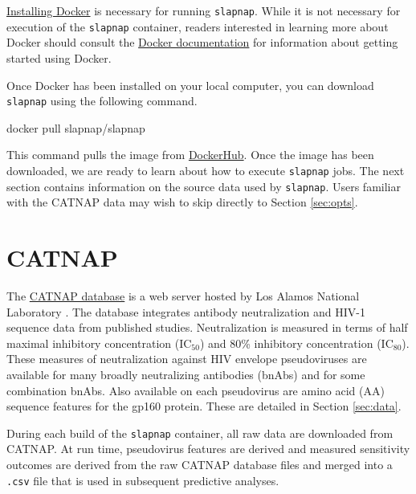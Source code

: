 \documentclass[]{article}
\newenvironment{Shaded}{\begin{snugshade}}{\end{snugshade}}
\newcommand{\ExtensionTok}[1]{#1}
\newcommand{\NormalTok}[1]{#1}
\begin{document}
\href{https://docs.docker.com/docker-for-windows/install/}{Installing
Docker} is necessary for running \texttt{slapnap}. While it is not
necessary for execution of the \texttt{slapnap} container, readers
interested in learning more about Docker should consult the
\href{https://docs.docker.com/get-started/}{Docker documentation} for
information about getting started using Docker.

Once Docker has been installed on your local computer, you can download
\texttt{slapnap} using the following command.

\begin{Shaded}
\begin{Highlighting}[]
\ExtensionTok{docker}\NormalTok{ pull slapnap/slapnap}
\end{Highlighting}
\end{Shaded}

This command pulls the image from
\href{https://hub.docker.com/}{DockerHub}. Once the image has been
downloaded, we are ready to learn about how to execute \texttt{slapnap}
jobs. The next section contains information on the source data used by
\texttt{slapnap}. Users familiar with the CATNAP data may wish to skip
directly to Section \ref{sec:opts}.

\section{CATNAP}\label{sec:catnap}

The
\href{https://www.hiv.lanl.gov/components/sequence/HIV/neutralization/index.html}{CATNAP
database} is a web server hosted by Los Alamos National Laboratory
\citep{yoon2015catnap}. The database integrates antibody neutralization
and HIV-1 sequence data from published studies. Neutralization is
measured in terms of half maximal inhibitory concentration (IC\(_{50}\))
and 80\% inhibitory concentration (IC\(_{80}\)). These measures of
neutralization against HIV envelope pseudoviruses are available for many
broadly neutralizing antibodies (bnAbs) and for some combination bnAbs.
Also available on each pseudovirus are amino acid (AA) sequence features
for the gp160 protein. These are detailed in Section \ref{sec:data}.

During each build of the \texttt{slapnap} container, all raw data are
downloaded from CATNAP. At run time, pseudovirus features are derived
and measured sensitivity outcomes are derived from the raw CATNAP
database files and merged into a \texttt{.csv} file that is used in
subsequent predictive analyses.
\end{document}
